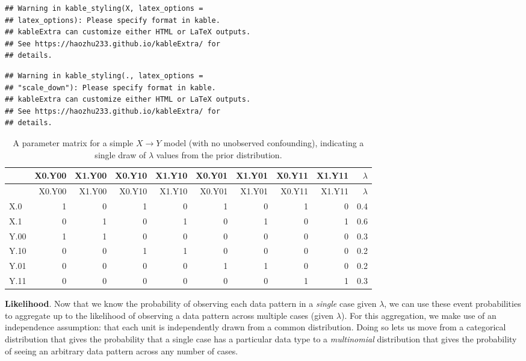 \documentclass[
  12pt,
]{book}
\begin{document}
\begin{verbatim}
## Warning in kable_styling(X, latex_options =
## latex_options): Please specify format in kable.
## kableExtra can customize either HTML or LaTeX outputs.
## See https://haozhu233.github.io/kableExtra/ for
## details.
\end{verbatim}

\begin{verbatim}
## Warning in kable_styling(., latex_options =
## "scale_down"): Please specify format in kable.
## kableExtra can customize either HTML or LaTeX outputs.
## See https://haozhu233.github.io/kableExtra/ for
## details.
\end{verbatim}

\begin{longtable}[]{@{}lrrrrrrrrr@{}}
\caption{\label{tab:parammmatrixmix}A parameter matrix for a simple \(X \rightarrow Y\) model (with no unobserved confounding), indicating a single draw of \(\lambda\) values from the prior distribution.}\tabularnewline
\toprule
& X0.Y00 & X1.Y00 & X0.Y10 & X1.Y10 & X0.Y01 & X1.Y01 & X0.Y11 & X1.Y11 & \(\lambda\) \\
\midrule
\endfirsthead
\toprule
& X0.Y00 & X1.Y00 & X0.Y10 & X1.Y10 & X0.Y01 & X1.Y01 & X0.Y11 & X1.Y11 & \(\lambda\) \\
\midrule
\endhead
X.0 & 1 & 0 & 1 & 0 & 1 & 0 & 1 & 0 & 0.4 \\
X.1 & 0 & 1 & 0 & 1 & 0 & 1 & 0 & 1 & 0.6 \\
Y.00 & 1 & 1 & 0 & 0 & 0 & 0 & 0 & 0 & 0.3 \\
Y.10 & 0 & 0 & 1 & 1 & 0 & 0 & 0 & 0 & 0.2 \\
Y.01 & 0 & 0 & 0 & 0 & 1 & 1 & 0 & 0 & 0.2 \\
Y.11 & 0 & 0 & 0 & 0 & 0 & 0 & 1 & 1 & 0.3 \\
\bottomrule
\end{longtable}

\textbf{Likelihood}. Now that we know the probability of observing each data pattern in a \emph{single} case given \(\lambda\), we can use these event probabilities to aggregate up to the likelihood of observing a data pattern across multiple cases (given \(\lambda\)). For this aggregation, we make use of an independence assumption: that each unit is independently drawn from a common distribution. Doing so lets us move from a categorical distribution that gives the probability that a single case has a particular data type to a \emph{multinomial} distribution that gives the probability of seeing an arbitrary data pattern across any number of cases.
\end{document}
